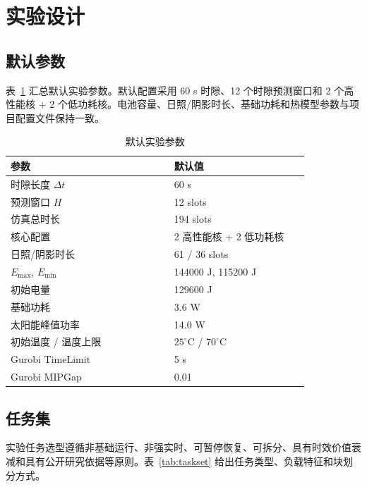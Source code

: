 \documentclass[conference]{IEEEtran}
\begin{document}
\section{实验设计}

\subsection{默认参数}

表~\ref{tab:default-params} 汇总默认实验参数。默认配置采用 60 s 时隙、12 个时隙预测窗口和 2 个高性能核 + 2 个低功耗核。电池容量、日照/阴影时长、基础功耗和热模型参数与项目配置文件保持一致。

\begin{table}[t]
\centering
\caption{默认实验参数}
\label{tab:default-params}
\begin{tabular}{p{0.46\linewidth}p{0.38\linewidth}}
\toprule
参数 & 默认值 \\
\midrule
时隙长度 $\Delta t$ & 60 s \\
预测窗口 $H$ & 12 slots \\
仿真总时长 & 194 slots \\
核心配置 & 2 高性能核 + 2 低功耗核 \\
日照/阴影时长 & 61 / 36 slots \\
$E_{\max}$, $E_{\min}$ & 144000 J, 115200 J \\
初始电量 & 129600 J \\
基础功耗 & 3.6 W \\
太阳能峰值功率 & 14.0 W \\
初始温度 / 温度上限 & $25^\circ\mathrm{C}$ / $70^\circ\mathrm{C}$ \\
Gurobi TimeLimit & 5 s \\
Gurobi MIPGap & 0.01 \\
\bottomrule
\end{tabular}
\end{table}

\subsection{任务集}

实验任务选型遵循非基础运行、非强实时、可暂停恢复、可拆分、具有时效价值衰减和具有公开研究依据等原则。表~\ref{tab:taskset} 给出任务类型、负载特征和块划分方式。
\end{document}
